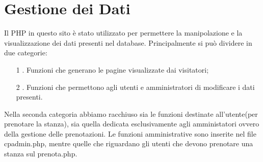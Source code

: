 \section{Gestione dei Dati}
Il PHP in questo sito è stato utilizzato per permettere la manipolazione e la visualizzazione dei dati presenti nel database. Principalmente si può dividere in due categorie:
\begin{itemize}
	\item [1]. Funzioni che generano le pagine visualizzate dai visitatori;
	\item [2]. Funzioni che permettono agli utenti e amministratori di modificare i dati presenti.
\end{itemize}
Nella seconda categoria abbiamo racchiuso sia le funzioni destinate all'utente(per prenotare la stanza), sia quella dedicata esclusivamente agli amministatori ovvero della gestione delle prenotazioni. Le funzioni amministrative sono inserite nel file cpadmin.php, mentre quelle che riguardano gli utenti che devono prenotare una stanza sul prenota.php.


